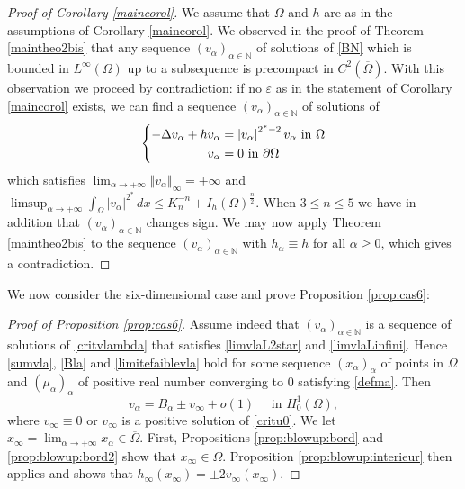 \documentclass[10pt]{amsart}
\numberwithin{equation}{section}
\newcommand{\ve}{\varepsilon}
\newcommand{\Om}{\Omega}
\newcommand{\ma}{\mu_\alpha}
\def \ma{\mu_{\alpha}}
\def \va{v_{\alpha}}
\theoremstyle{plain}
\theoremstyle{remark}
\begin{document}
 \begin{proof}[Proof of Corollary \ref{maincorol}]
We assume that $\Om$ and $h$ are as in the assumptions of Corollary \ref{maincorol}. We observed in the proof of Theorem \ref{maintheo2bis} that any sequence $(\va)_{\alpha \in \mathbb{N}}$ of solutions of \eqref{BN} which is bounded in $L^\infty(\Om)$ up to a subsequence is precompact in $C^2(\overline{\Om})$. With this observation we proceed by contradiction: if no $\ve$ as in the statement of Corollary \ref{maincorol} exists, we can find a sequence $(\va)_{\alpha \in \mathbb{N}}$ of solutions of 
 \begin{equation*}
 	\left\{\begin{aligned}
		-\Delta \va +h \va &=\left|\va\right|^{2^*-2}\va \hbox{ in } \Omega \\
		\va&= 0  \hbox{ in } \partial \Omega
	\end{aligned}\right.
\end{equation*}
which satisfies $\lim_{\alpha \to + \infty} \Vert \va \Vert_{\infty} = + \infty$ and $\limsup_{\alpha \to + \infty} \int_{\Om} |\va|^{2^*} \, dx \le K_n^{-n} + I_h(\Om)^{\frac{n}{2}}$. When $3 \le n \le 5$ we have in addition that $(\va)_{\alpha \in \mathbb{N}}$ changes sign. We may now apply Theorem \ref{maintheo2bis} to the sequence $(\va)_{\alpha \in \mathbb{N}}$ with $h_\alpha \equiv h$ for all $\alpha \ge 0$, which gives a contradiction. 
 \end{proof}
 
 We now consider the six-dimensional case and prove Proposition \ref{prop:cas6}: 
 
 \begin{proof}[Proof of Proposition \ref{prop:cas6}]
Assume indeed that $(v_\alpha)_{\alpha \in \mathbb{N}}$ is a sequence of solutions of \eqref{critvlambda} that satisfies \eqref{limvlaL2star} and \eqref{limvlaLinfini}. Hence \eqref{sumvla}, \eqref{Bla} and \eqref{limitefaiblevla} hold for some sequence $(x_{\alpha})_{\alpha}$ of points in $\Om$ and $(\ma)_{\alpha}$ of positive real number converging to $0$ satisfying \eqref{defma}. Then
$$ v_\alpha = B_{\alpha} \pm v_\infty + o(1) \quad \text{ in } H^1_0(\Om),$$
where $v_{\infty}\equiv 0$ or $v_\infty$ is a positive solution of \eqref{critu0}. We let $x_\infty = \lim_{\alpha \to + \infty} x_\alpha \in \overline{\Om}$. First, Propositions  \ref{prop:blowup:bord} and \ref{prop:blowup:bord2} show that  $x_\infty \in \Om$. Proposition \ref{prop:blowup:interieur} then applies and shows that $h_\infty(x_\infty) = \pm 2 v_\infty(x_\infty)$. 
 \end{proof}
 
\end{document}
